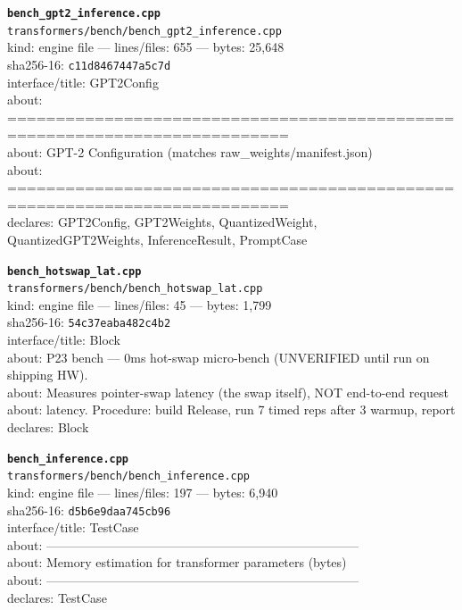 \noindent\textbf{\texttt{bench\_gpt2\_inference.cpp}}\\
\texttt{transformers/bench/bench\_gpt2\_inference.cpp}\\
kind: engine file --- lines/files: 655 --- bytes: 25,648\\
sha256-16: \texttt{c11d8467447a5c7d}\\
interface/title: GPT2Config\\
about: ===========================================================================\\
about: GPT-2 Configuration (matches raw\_weights/manifest.json)\\
about: ===========================================================================\\
declares: GPT2Config, GPT2Weights, QuantizedWeight, QuantizedGPT2Weights, InferenceResult, PromptCase\\
\vspace*{6.0pt}
\newpage

\noindent\textbf{\texttt{bench\_hotswap\_lat.cpp}}\\
\texttt{transformers/bench/bench\_hotswap\_lat.cpp}\\
kind: engine file --- lines/files: 45 --- bytes: 1,799\\
sha256-16: \texttt{54c37eaba482c4b2}\\
interface/title: Block\\
about: P23 bench — 0ms hot-swap micro-bench (UNVERIFIED until run on shipping HW).\\
about: Measures pointer-swap latency (the swap itself), NOT end-to-end request\\
about: latency. Procedure: build Release, run 7 timed reps after 3 warmup, report\\
declares: Block\\
\vspace*{6.0pt}

\noindent\textbf{\texttt{bench\_inference.cpp}}\\
\texttt{transformers/bench/bench\_inference.cpp}\\
kind: engine file --- lines/files: 197 --- bytes: 6,940\\
sha256-16: \texttt{d5b6e9daa745cb96}\\
interface/title: TestCase\\
about: ---------------------------------------------------------------------------\\
about: Memory estimation for transformer parameters (bytes)\\
about: ---------------------------------------------------------------------------\\
declares: TestCase\\
\vspace*{6.0pt}

